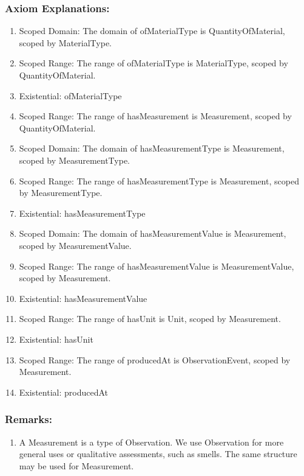 \subsubsection*{Axiom Explanations:}
\begin{enumerate}
    \item Scoped Domain: The domain of \textsf{ofMaterialType} is \textsf{QuantityOfMaterial}, scoped by \textsf{MaterialType}.
    \item Scoped Range: The range of \textsf{ofMaterialType} is \textsf{MaterialType}, scoped by \textsf{QuantityOfMaterial}.
    \item Existential: \textsf{ofMaterialType}
    \item Scoped Range: The range of \textsf{hasMeasurement} is \textsf{Measurement}, scoped by \textsf{QuantityOfMaterial}.
    \item Scoped Domain: The domain of \textsf{hasMeasurementType} is \textsf{Measurement}, scoped by \textsf{MeasurementType}.
    \item Scoped Range: The range of \textsf{hasMeasurementType} is \textsf{Measurement}, scoped by \textsf{MeasurementType}.
    \item Existential: \textsf{hasMeasurementType}
    \item Scoped Domain: The domain of \textsf{hasMeasurementValue} is \textsf{Measurement}, scoped by \textsf{MeasurementValue}.
    \item Scoped Range: The range of \textsf{hasMeasurementValue} is \textsf{MeasurementValue}, scoped by \textsf{Measurement}.
    \item Existential: \textsf{hasMeasurementValue}
    \item Scoped Range: The range of \textsf{hasUnit} is \textsf{Unit}, scoped by \textsf{Measurement}.
    \item Existential: \textsf{hasUnit}
    \item Scoped Range: The range of \textsf{producedAt} is \textsf{ObservationEvent}, scoped by \textsf{Measurement}.
    \item Existential: \textsf{producedAt}
\end{enumerate}

\subsubsection*{Remarks:}
\begin{enumerate}
    \item A Measurement is a type of Observation. We use Observation for more general uses or qualitative assessments, such as smells. The same structure may be used for Measurement.
\end{enumerate}

